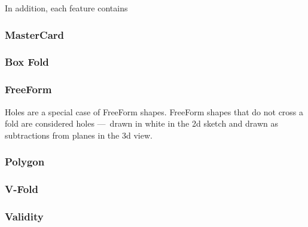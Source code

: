 In addition, each feature contains

\subsubsection{MasterCard}\label{mastercard}

\subsubsection{Box Fold}\label{box-fold}

\subsubsection{FreeForm}\label{freeform}

Holes are a special case of FreeForm shapes. FreeForm shapes that do not
cross a fold are considered holes ---~drawn in white in the 2d sketch
and drawn as subtractions from planes in the 3d view.

\subsubsection{Polygon}\label{polygon}

\subsubsection{V-Fold}\label{v-fold}

\subsubsection{Validity}\label{validity}

